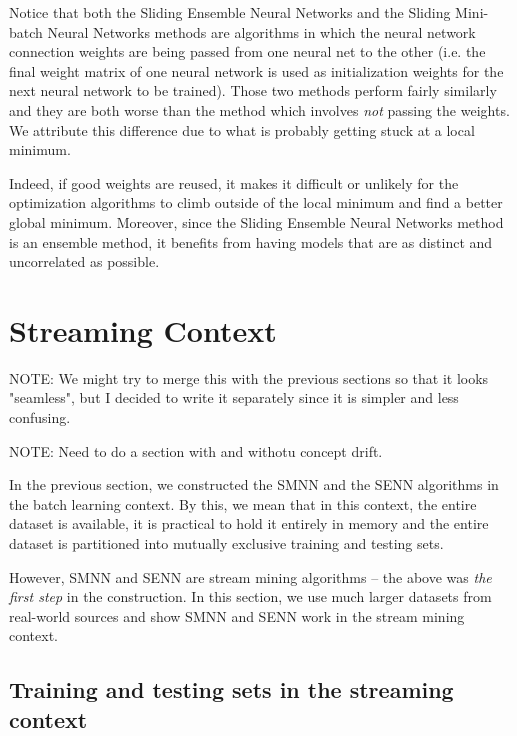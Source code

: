 \documentclass[conference]{IEEEtran}
\begin{document}
		
		Notice that both the Sliding Ensemble Neural Networks and the Sliding Mini-batch Neural Networks methods are algorithms in which the neural network connection weights are being passed from one neural net to the other (i.e. the final weight matrix of one neural network is used as initialization weights for the next neural network to be trained). Those two methods perform fairly similarly and they are both worse than the method which involves \emph{not} passing the weights. We attribute this difference due to what is probably getting stuck at a local minimum.
		
		Indeed, if good weights are reused, it makes it  difficult or unlikely for the optimization algorithms to climb outside of the local minimum and find a better global minimum. Moreover, since the Sliding Ensemble Neural Networks method is an ensemble method, it benefits from having models that are as distinct and uncorrelated as possible.
		
		\section{Streaming Context}
		
		NOTE: We might try to merge this with the previous sections so that it looks "seamless", but I decided to write it separately since it is simpler and less confusing.
		
		NOTE: Need to do a section with and withotu concept drift.
		
		In the previous section, we constructed the SMNN and the SENN algorithms in the batch learning context. By this, we mean that in this context, the entire dataset is available, it is practical to hold it entirely in memory and the entire dataset is partitioned into mutually exclusive training and testing sets.
		
		However, SMNN and SENN are stream mining algorithms -- the above was \emph{the first step} in the construction. In this section, we use much larger datasets from real-world sources and show SMNN and SENN work in the stream mining context.
		
		\subsection{Training and testing sets in the streaming context}
		
\end{document}
